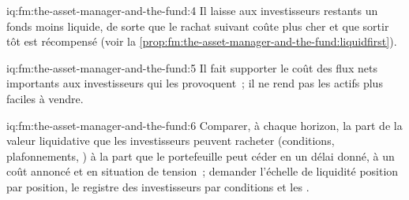 \begin{solution}{iq:fm:the-asset-manager-and-the-fund:4}
Il laisse aux investisseurs restants un fonds moins liquide, de sorte que le rachat suivant coûte plus cher et que sortir tôt est récompensé
(voir la \cref{prop:fm:the-asset-manager-and-the-fund:liquidfirst}).
\end{solution}

\begin{solution}{iq:fm:the-asset-manager-and-the-fund:5}
Il fait supporter le coût des flux nets importants aux investisseurs qui les provoquent~; il ne rend pas les actifs plus faciles à vendre.
\end{solution}

\begin{solution}{iq:fm:the-asset-manager-and-the-fund:6}
Comparer, à chaque horizon, la part de la valeur liquidative que les investisseurs peuvent racheter (conditions, plafonnements, ) à la part que le portefeuille peut céder en
un délai donné, à un coût annoncé et en situation de tension~; demander l'échelle de liquidité position par position, le registre des investisseurs par conditions et les .
\end{solution}
